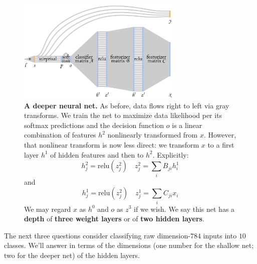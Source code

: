 \documentclass[11pt, justified]{tufte-book}
\theoremstyle{definition}
\begin{document}
        \begin{figure}[h]
          \centering
              \includegraphics[width=0.700\textwidth]{deep}
          \caption{%
            \textbf{A deeper neural net.} As before, data flows right to left
            via {\gre gray} transforms.
            We train the net to maximize data likelihood per its softmax
            predictions and the decision function $o$ is a linear combination
            of features $h^2$ nonlinearly transformed from $x$.
            However, that nonlinear transform is now less direct: we transform
            $x$ to a first layer $h^1$ of hidden features and then to $h^2$.
            Explicitly:\vspace{-0.1cm}
            $$
                h^2_j = \text{relu}(z^2_j) 
                \quad
                z^2_j = \textstyle\sum_{i} B_{ji} h^1_i 
            $$
            and\vspace{-0.1cm}
            $$
                h^1_j = \text{relu}(z^2_j)
                \quad
                z^1_j = \textstyle\sum_{i} C_{ji} x_i 
            $$
            We may regard $x$ as $h^0$ and $o$ as $z^3$ if we wish.
            We say this net has a \textbf{depth} of
            \textbf{three weight layers} or of \textbf{two hidden layers}. 
          }
        \end{figure}

        The next three questions consider classifying
        raw dimension-$784$ inputs into $10$ classes.  We'll answer in terms of
        the dimensions (one number for the shallow net; two for the deeper net)
        of the hidden layers.
\end{document}
